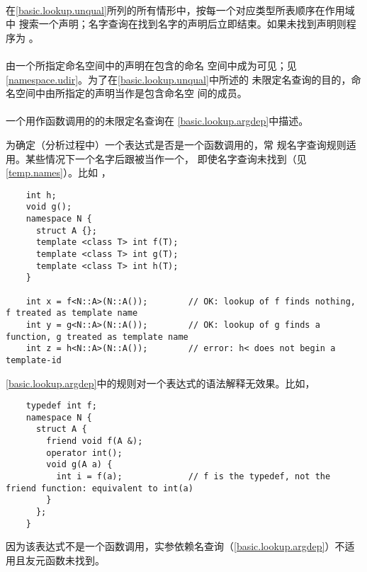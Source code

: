 \paragraph{} %
在\ref{basic.lookup.unqual}所列的所有情形中，按每一个对应类型所表顺序在作用域中
搜索一个声明；名字查询在找到名字的声明后立即结束。如果未找到声明则程序为
\illform{}。

\paragraph{} %
由一个所指定命名空间中的声明在包含的命名
空间中成为可见；见\ref{namespace.udir}。为了在\ref{basic.lookup.unqual}中所述的
未限定名查询的目的，命名空间中由所指定的声明当作是包含命名空
间的成员。

\paragraph{} %
一个用作函数调用的的未限定名查询在
\ref{basic.lookup.argdep}中描述。

\begin{note} %
  为确定（分析过程中）一个表达式是否是一个函数调用的，常
  规名字查询规则适用。某些情况下一个名字后跟\tm{<}被当作一个，
  即使名字查询未找到（见\ref{temp.names}）。比如 ，
  \begin{lstlisting}
    int h;
    void g();
    namespace N {
      struct A {};
      template <class T> int f(T);
      template <class T> int g(T);
      template <class T> int h(T);
    }

    int x = f<N::A>(N::A());        // OK: lookup of f finds nothing, f treated as template name
    int y = g<N::A>(N::A());        // OK: lookup of g finds a function, g treated as template name
    int z = h<N::A>(N::A());        // error: h< does not begin a template-id
  \end{lstlisting}
  \ref{basic.lookup.argdep}中的规则对一个表达式的语法解释无效果。比如，
  \begin{lstlisting}
    typedef int f;
    namespace N {
      struct A {
        friend void f(A &);
        operator int();
        void g(A a) {
          int i = f(a);             // f is the typedef, not the friend function: equivalent to int(a)
        }
      };
    }
  \end{lstlisting}
  因为该表达式不是一个函数调用，实参依赖名查询（\ref{basic.lookup.argdep}）不适
  用且友元函数未找到。
\end{note}


